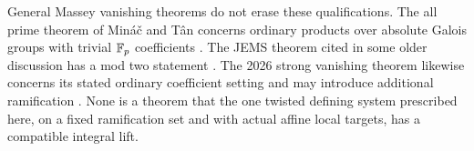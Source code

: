 General Massey vanishing theorems do not erase these qualifications. The all prime theorem of Min\'{a}\v{c} and T\^{a}n concerns ordinary products over absolute Galois groups with trivial $\mathbb F_p$ coefficients \cite{minac-tan2016}. The JEMS theorem cited in some older discussion has a mod two statement \cite{minac-tan2017}. The 2026 strong vanishing theorem likewise concerns its stated ordinary coefficient setting and may introduce additional ramification \cite{maire-et-al2026}. None is a theorem that the one twisted defining system prescribed here, on a fixed ramification set and with actual affine local targets, has a compatible integral lift.

